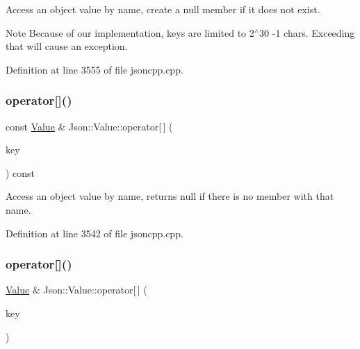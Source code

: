 Access an object value by name, create a null member if it does not exist. \begin{DoxyNote}{Note}
Because of our implementation, keys are limited to 2$^\wedge$30 -\/1 chars. Exceeding that will cause an exception. 
\end{DoxyNote}


Definition at line 3555 of file jsoncpp.\+cpp.

\hypertarget{class_json_1_1_value_a1b0498b7b2a520a68137f682d91abdd5}{}\label{class_json_1_1_value_a1b0498b7b2a520a68137f682d91abdd5} 
\subsubsection{\texorpdfstring{operator[]()}{operator[]()}\hspace{0.1cm}{\footnotesize\ttfamily [15/18]}}
{\footnotesize\ttfamily const \hyperlink{class_json_1_1_value}{Value} \& Json\+::\+Value\+::operator\mbox{[}$\,$\mbox{]} (\begin{DoxyParamCaption}\item[{const char $\ast$}]{key }\end{DoxyParamCaption}) const}

Access an object value by name, returns null if there is no member with that name. 

Definition at line 3542 of file jsoncpp.\+cpp.

\hypertarget{class_json_1_1_value_aedd1e152756a4cc8c1ebac0dd7aeeb78}{}\label{class_json_1_1_value_aedd1e152756a4cc8c1ebac0dd7aeeb78} 
\subsubsection{\texorpdfstring{operator[]()}{operator[]()}\hspace{0.1cm}{\footnotesize\ttfamily [16/18]}}
{\footnotesize\ttfamily \hyperlink{class_json_1_1_value}{Value} \& Json\+::\+Value\+::operator\mbox{[}$\,$\mbox{]} (\begin{DoxyParamCaption}\item[{const \hyperlink{config_8h_a1e723f95759de062585bc4a8fd3fa4be}{J\+S\+O\+N\+C\+P\+P\+\_\+\+S\+T\+R\+I\+NG} \&}]{key }\end{DoxyParamCaption})}

